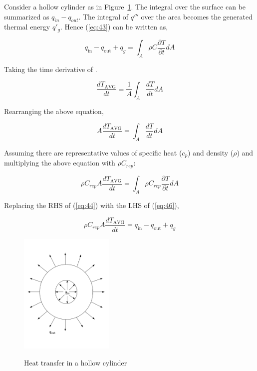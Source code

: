 Consider a hollow cylinder as in Figure~\ref{Fig_heat}. The integral over the
surface can be summarized as $q_{in}-q_{out}$. The integral of $q'''$ over the
area becomes the generated thermal energy $q'_g$. Hence (\ref{eq:43}) can be
written as,

\begin{equation}
  q_{\mathrm{in}}-q_{\mathrm{out}}+q_g= \int_A \rho C \frac{\partial T}{\partial t}dA \label{eq:44}
\end{equation}

Taking the time derivative of .

\begin{equation}
\frac{ dT_{\mathrm{AVG}}}{dt}= \frac{1}{A} \int_{A} \frac{dT}{dt}dA
\end{equation}

Rearranging the above equation,

\begin{equation}
A\frac{ dT_{\mathrm{AVG}}}{dt}= \int_{A} \frac{dT}{dt}dA
\end{equation}

 Assuming there are representative values of specific heat ($c_p$) and density
 ($\rho$) and multiplying the above equation with $\rho C_{rep}$:

\begin{equation}
\rho C_{rep} A\frac{dT_{\mathrm{AVG}}}{dt} =  \int_A \rho C_{rep} \frac{\partial T}{\partial t}dA \label{eq:46}
\end{equation}

Replacing the RHS of (\ref{eq:44}) with the LHS of (\ref{eq:46}),

\begin{equation}
\rho C_{rep} A\frac{dT_{\mathrm{AVG}}}{dt} = q_{\mathrm{in}}-q_{\mathrm{out}}+q_g \label{eq:TAV}
\end{equation}

\begin{figure}
\begin{center}
{
 \includegraphics[width=0.4\textwidth]{heat.png}
}
\caption{\label{Fig_heat} Heat transfer in a hollow cylinder}
\end{center}
\end{figure}

